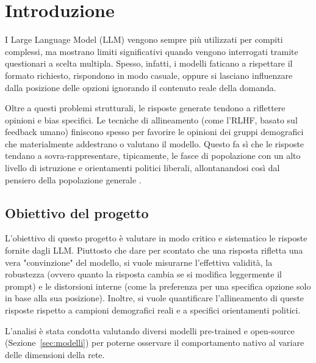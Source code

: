\documentclass[../relazione.tex]{subfiles}
\begin{document}
\section{Introduzione}

I Large Language Model (LLM) vengono sempre più utilizzati per compiti complessi, ma mostrano limiti significativi quando vengono interrogati tramite questionari a scelta multipla. Spesso, infatti, i modelli faticano a rispettare il formato richiesto, rispondono in modo casuale, oppure si lasciano influenzare dalla posizione delle opzioni ignorando il contenuto reale della domanda.

Oltre a questi problemi strutturali, le risposte generate tendono a riflettere opinioni e bias specifici. Le tecniche di allineamento (come l'RLHF, basato sul feedback umano) finiscono spesso per favorire le opinioni dei gruppi demografici che materialmente addestrano o valutano il modello. Questo fa sì che le risposte tendano a sovra-rappresentare, tipicamente, le fasce di popolazione con un alto livello di istruzione e orientamenti politici liberali, allontanandosi così dal pensiero della popolazione  generale \cite{santurkar2023whose}.

\subsection{Obiettivo del progetto}
L'obiettivo di questo progetto è valutare in modo critico e sistematico le risposte fornite dagli LLM. Piuttosto che dare per scontato che una risposta rifletta una vera "convinzione" del modello, si vuole misurarne l'effettiva validità, la robustezza (ovvero quanto la risposta cambia se si modifica leggermente il prompt) e le distorsioni interne (come la preferenza per una specifica opzione solo in base alla sua posizione). Inoltre, si vuole quantificare l'allineamento di queste risposte rispetto a campioni demografici reali e a specifici orientamenti politici. 

L'analisi è stata condotta valutando diversi modelli pre-trained e open-source (Sezione~\ref{sec:modelli}) per poterne osservare il comportamento nativo al variare delle dimensioni della rete.
\end{document}
